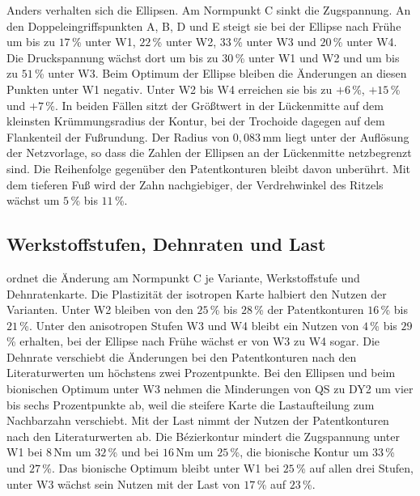 Anders verhalten sich die Ellipsen. Am Normpunkt C sinkt die Zugspannung. An den Doppeleingriffspunkten A, B, D und E steigt sie bei der Ellipse nach Frühe um bis zu $17$\,\% unter W1, $22$\,\% unter W2, $33$\,\% unter W3 und $20$\,\% unter W4. Die Druckspannung wächst dort um bis zu $30$\,\% unter W1 und W2 und um bis zu $51$\,\% unter W3. Beim Optimum der Ellipse bleiben die Änderungen an diesen Punkten unter W1 negativ. Unter W2 bis W4 erreichen sie bis zu $+6$\,\%, $+15$\,\% und $+7$\,\%. In beiden Fällen sitzt der Größtwert in der Lückenmitte auf dem kleinsten Krümmungsradius der Kontur, bei der Trochoide dagegen auf dem Flankenteil der Fußrundung. Der Radius von $0{,}083$\,mm liegt unter der Auflösung der Netzvorlage, so dass die Zahlen der Ellipsen an der Lückenmitte netzbegrenzt sind. Die Reihenfolge gegenüber den Patentkonturen bleibt davon unberührt. Mit dem tieferen Fuß wird der Zahn nachgiebiger, der Verdrehwinkel des Ritzels wächst um $5$\,\% bis $11$\,\%.


\subsection{Werkstoffstufen, Dehnraten und Last}
\label{sec:fussgeometrie_stufen}

 ordnet die Änderung am Normpunkt C je Variante, Werkstoffstufe und Dehnratenkarte. Die Plastizität der isotropen Karte halbiert den Nutzen der Varianten. Unter W2 bleiben von den $25$\,\% bis $28$\,\% der Patentkonturen $16$\,\% bis $21$\,\%. Unter den anisotropen Stufen W3 und W4 bleibt ein Nutzen von $4$\,\% bis $29$\,\% erhalten, bei der Ellipse nach Frühe wächst er von W3 zu W4 sogar. Die Dehnrate verschiebt die Änderungen bei den Patentkonturen nach den Literaturwerten um höchstens zwei Prozentpunkte. Bei den Ellipsen und beim bionischen Optimum unter W3 nehmen die Minderungen von QS zu DY2 um vier bis sechs Prozentpunkte ab, weil die steifere Karte die Lastaufteilung zum Nachbarzahn verschiebt. Mit der Last nimmt der Nutzen der Patentkonturen nach den Literaturwerten ab. Die Bézierkontur mindert die Zugspannung unter W1 bei $8$\,Nm um $32$\,\% und bei $16$\,Nm um $25$\,\%, die bionische Kontur um $33$\,\% und $27$\,\%. Das bionische Optimum bleibt unter W1 bei $25$\,\% auf allen drei Stufen, unter W3 wächst sein Nutzen mit der Last von $17$\,\% auf $23$\,\%.

